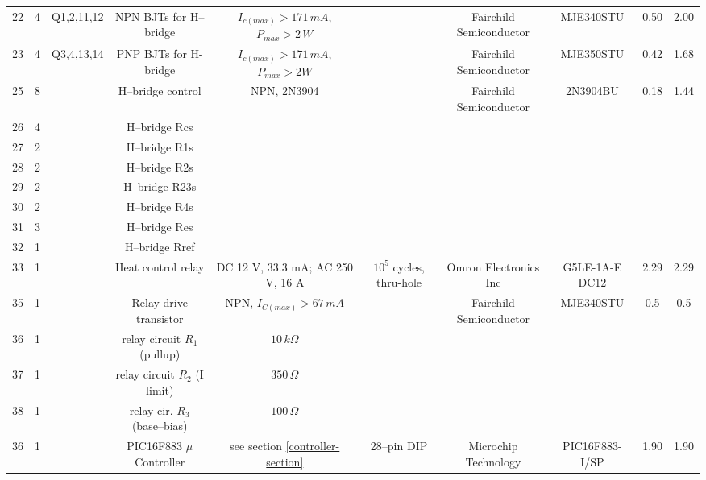 \documentclass[10pt, twocolumn]{article}
\begin{document}
\begin{center}
\begin{adjustbox}{max width=\textwidth}
\begin{tabular}{c c c c c c c c c c}
22	&4	&Q1,2,11,12	&NPN BJTs for H--bridge	&$I_{c(max)}>171\,mA$, $P_{max}>2\,W$	&
	&Fairchild Semiconductor	&MJE340STU	&0.50		&2.00	\\

23	&4	&Q3,4,13,14	&PNP BJTs for H-bridge	&$I_{c(max)}>171\,mA$, $P_{max}>2W$	&
	&Fairchild Semiconductor	&MJE350STU	&0.42		&1.68	\\

25	&8	&	&H--bridge control	&NPN, 2N3904			&
	&Fairchild Semiconductor	&2N3904BU	&0.18		&1.44	\\

26	&4	&	&H--bridge Rcs			&					&
	&			&			&		&	\\

27	&2	&	&H--bridge R1s			&					&
	&			&			&		&	\\

28	&2	&	&H--bridge R2s			&					&
	&			&			&		&	\\

29	&2	&	&H--bridge R23s			&					&
	&			&			&		&	\\

30	&2	&	&H--bridge R4s			&					&
	&			&			&		&	\\

31	&3	&	&H--bridge Res			&					&
	&			&			&		&	\\

32	&1	&	&H--bridge Rref			&					&
	&			&			&		&	\\

33	&1	&	&Heat control relay		&DC 12 V, 33.3 mA; AC 250 V, 16 A	&$10^5$ cycles, thru-hole
	&Omron Electronics Inc	&G5LE-1A-E DC12		&2.29		&2.29	\\

35	&1	&	&Relay drive transistor		&NPN, $I_{C(max)}>67\,mA$		&
	&Fairchild Semiconductor	&MJE340STU	&0.5		&0.5	\\

36	&1	&	&relay circuit $R_{1}$ (pullup)	&$10\,k\Omega$				&
	&				&		&		&	\\

37	&1	&	&relay circuit $R_{2}$ (I limit)	&$350\,\Omega$			&
	&				&		&		&	\\

38	&1	&	&relay cir. $R_{3}$ (base--bias)	&$100\,\Omega$			&
	&				&		&		&	\\

36	&1	&	&PIC16F883 $\mu$Controller	&see section \ref{controller-section}	&28--pin DIP
	&Microchip Technology	&PIC16F883-I/SP		&1.90		&1.90	\\


\end{tabular}
\end{adjustbox}
\end{center}
\end{document}
